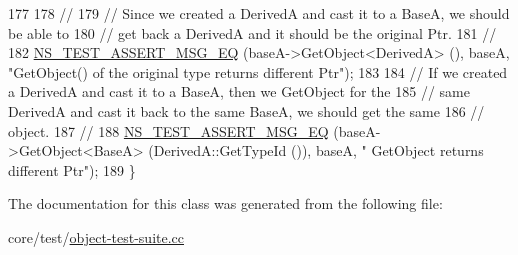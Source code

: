 \begin{DoxyCode}
177 
178   \textcolor{comment}{//}
179   \textcolor{comment}{// Since we created a DerivedA and cast it to a BaseA, we should be able to }
180   \textcolor{comment}{// get back a DerivedA and it should be the original Ptr.}
181   \textcolor{comment}{//}
182   \hyperlink{group__testing_ga2a9d78cffb3db8e867c35fff0b698cf5}{NS\_TEST\_ASSERT\_MSG\_EQ} (baseA->GetObject<DerivedA> (), baseA, \textcolor{stringliteral}{"GetObject() of the
       original type returns different Ptr"});
183 
184   \textcolor{comment}{// If we created a DerivedA and cast it to a BaseA, then we GetObject for the }
185   \textcolor{comment}{// same DerivedA and cast it back to the same BaseA, we should get the same }
186   \textcolor{comment}{// object.}
187   \textcolor{comment}{//}
188   \hyperlink{group__testing_ga2a9d78cffb3db8e867c35fff0b698cf5}{NS\_TEST\_ASSERT\_MSG\_EQ} (baseA->GetObject<BaseA> (DerivedA::GetTypeId ()), baseA, \textcolor{stringliteral}{"
      GetObject returns different Ptr"});
189 \}
\end{DoxyCode}


The documentation for this class was generated from the following file\+:\begin{DoxyCompactItemize}
\item 
core/test/\hyperlink{object-test-suite_8cc}{object-\/test-\/suite.\+cc}\end{DoxyCompactItemize}
